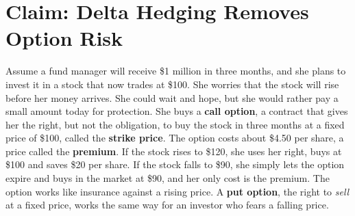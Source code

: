 \makeatletter
{}
\makeatother

\makeatletter
\makeatother

\chapter{Claim: Delta Hedging Removes Option Risk}
\label{ch:17}

Assume a fund manager will receive \$1 million in three months, and she plans to invest it in a stock that now trades at \$100. She worries that the stock will rise before her money arrives. She could wait and hope, but she would rather pay a small amount today for protection. She buys a \textbf{call option}, a contract that gives her the right, but not the obligation, to buy the stock in three months at a fixed price of \$100, called the \textbf{strike price}. The option costs about \$4.50 per share, a price called the \textbf{premium}. If the stock rises to \$120, she uses her right, buys at \$100 and saves \$20 per share. If the stock falls to \$90, she simply lets the option expire and buys in the market at \$90, and her only cost is the premium. The option works like insurance against a rising price. A \textbf{put option}, the right to \emph{sell} at a fixed price, works the same way for an investor who fears a falling price.

